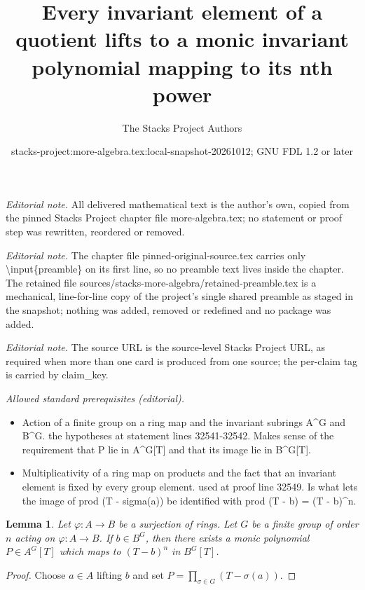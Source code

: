 \documentclass[10pt,a4paper]{amsart}
\title{Every invariant element of a quotient lifts to a monic invariant polynomial mapping to its nth power}
\author{The Stacks Project Authors}
\date{stacks-project:more-algebra.tex:local-snapshot-20261012; GNU FDL 1.2 or later}
\theoremstyle{plain}
\newtheorem{lemma}[subsection]{Lemma}
\theoremstyle{definition}
\theoremstyle{remark}
\numberwithin{equation}{subsection}
\begin{document}
\maketitle
\setcounter{subsection}{1}
\noindent\textit{Editorial note.} All delivered mathematical text is the author's own, copied from the pinned Stacks Project chapter file more-algebra.tex; no statement or proof step was rewritten, reordered or removed.\par\medskip
\noindent\textit{Editorial note.} The chapter file pinned-original-source.tex carries only \textbackslash{}input\{preamble\} on its first line, so no preamble text lives inside the chapter. The retained file sources/stacks-more-algebra/retained-preamble.tex is a mechanical, line-for-line copy of the project's single shared preamble as staged in the snapshot; nothing was added, removed or redefined and no package was added.\par\medskip
\noindent\textit{Editorial note.} The source URL is the source-level Stacks Project URL, as required when more than one card is produced from one source; the per-claim tag is carried by claim\_key.\par\medskip
\noindent\textit{Allowed standard prerequisites (editorial).}\begin{itemize}
\item Action of a finite group on a ring map and the invariant subrings A\textasciicircum{}G and B\textasciicircum{}G. the hypotheses at statement lines 32541-32542. Makes sense of the requirement that P lie in A\textasciicircum{}G[T] and that its image lie in B\textasciicircum{}G[T].
\item Multiplicativity of a ring map on products and the fact that an invariant element is fixed by every group element. used at proof line 32549. Is what lets the image of prod (T - sigma(a)) be identified with prod (T - b) = (T - b)\textasciicircum{}n.
\end{itemize}\medskip
\begin{lemma}
\label{lemma-pol-lifting}
Let $\varphi : A \to B$ be a surjection of rings. Let $G$ be a finite group
of order $n$ acting on $\varphi : A \to B$. If $b \in B^G$, then
there exists a monic polynomial $P \in A^G[T]$ which maps to
$(T - b)^n$ in $B^G[T]$.
\end{lemma}

\begin{proof}
Choose $a \in A$ lifting $b$ and set
$P = \prod_{\sigma \in G} (T - \sigma(a))$.
\end{proof}
\end{document}
